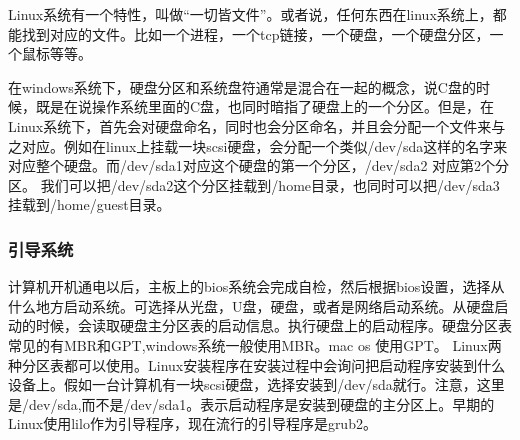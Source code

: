 \documentclass[UTF8]{ctexart}
\begin{document}
\par
Linux系统有一个特性，叫做“一切皆文件”。或者说，任何东西在linux系统上，都能找到对应的文件。比如一个进程，一个tcp链接，一个硬盘，一个硬盘分区，一个鼠标等等。
\par
在windows系统下，硬盘分区和系统盘符通常是混合在一起的概念，说C盘的时候，既是在说操作系统里面的C盘，也同时暗指了硬盘上的一个分区。但是，在Linux系统下，首先会对硬盘命名，同时也会分区命名，并且会分配一个文件来与之对应。例如在linux上挂载一块scsi硬盘，会分配一个类似/dev/sda这样的名字来对应整个硬盘。而/dev/sda1对应这个硬盘的第一个分区，/dev/sda2 对应第2个分区。
我们可以把/dev/sda2这个分区挂载到/home目录，也同时可以把/dev/sda3挂载到/home/guest目录。

\subsubsection{\msyh 引导系统}
计算机开机通电以后，主板上的bios系统会完成自检，然后根据bios设置，选择从什么地方启动系统。可选择从光盘，U盘，硬盘，或者是网络启动系统。从硬盘启动的时候，会读取硬盘主分区表的启动信息。执行硬盘上的启动程序。硬盘分区表常见的有MBR和GPT,windows系统一般使用MBR。mac os 使用GPT。 Linux两种分区表都可以使用。Linux安装程序在安装过程中会询问把启动程序安装到什么设备上。假如一台计算机有一块scsi硬盘，选择安装到/dev/sda就行。注意，这里是/dev/sda,而不是/dev/sda1。表示启动程序是安装到硬盘的主分区上。早期的Linux使用lilo作为引导程序，现在流行的引导程序是grub2。
\end{document}
